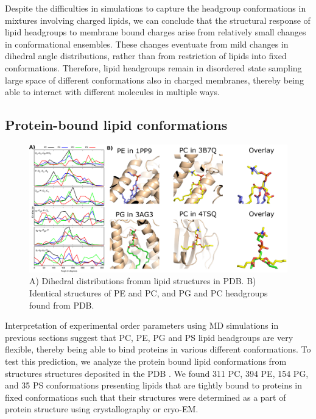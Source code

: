 \documentclass[aps,prl,superscriptaddress,twocolumn]{revtex4}
\begin{document}
Despite the difficulties in simulations to capture the headgroup conformations in mixtures involving charged lipids,
we can conclude that the structural response of lipid headgroups to 
membrane bound charges arise from relatively small changes in conformational ensembles.
These changes eventuate from mild changes in dihedral angle distributions, rather than from restriction of lipids into
fixed conformations. Therefore, lipid headgroups remain in disordered state sampling large space of different conformations
also in charged membranes, thereby being able to interact with different molecules in multiple ways.



\subsection{Protein-bound lipid conformations}

\begin{figure}[]
  \centering
  \includegraphics[width=19.0cm]{./Figs/figure4.eps}
  \caption{\label{dihedralsFROMpdb}
    A) Dihedral distributions fromm lipid structures in PDB.
    B) Identical structures of PE and PC, and PG and PC headgroups found from PDB.
  }
\end{figure}


Interpretation of experimental order parameters using MD simulations
in previous sections suggest that PC, PE, PG and PS lipid headgroups are very flexible,
thereby being able to bind proteins in various different conformations.
To test this prediction, we analyze the protein bound lipid conformations
from structures structures deposited in the PDB \cite{berman00}.
We found 311 PC, 394 PE, 154 PG, and 35 PS conformations presenting
lipids that are tightly bound to proteins in fixed conformations
such that their structures were determined as a part of protein structure using crystallography or cryo-EM. 
\end{document}
